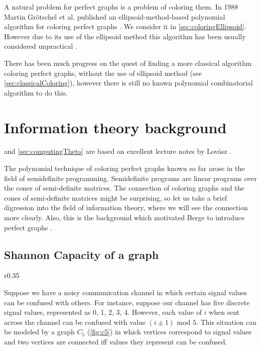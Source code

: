 A natural problem for perfect graphs is a problem of coloring them. In 1988 Martin Grötschel et al. published an ellipsoid-method-based polynomial algorithm for coloring perfect graphs \cite{Grtschel1993}. We consider it in \cref{sec:coloringEllipsoid}. However due to its use of the ellipsoid method this algorithm has been usually considered unpractical \cite{coloringSquareFree,Chudnovsky2003, coloringArtemis}.

There has been much progress on the quest of finding a more classical algorithm coloring perfect graphs, without the use of ellipsoid method (see \cref{sec:classicalColoring}), however there is still no known polynomial combinatorial algorithm to do this. 

\section{Information theory background}
\label{sec:InformationTheory}

 and \cref{sec:computingTheta} are based on excellent lecture notes by Lovász \cite{Lovasz95}.

The polynomial technique of coloring perfect graphs known so far arose in the field of semidefinite programming. Semidefinite programs are linear programs over the cones of semi-definite matrices. The connection of coloring graphs and the cones of semi-definite matrices might be surprising, so let us take a brief digression into the field of information theory, where we will see the connection more clearly. Also, this is the background which motivated Berge to introduce perfect graphs \cite{Chudnovsky2003}.

\subsection{Shannon Capacity of a graph}

\begin{wrapfigure}{r}{0.35\textwidth}
  
  \caption{An example of a noisy channel}%
  \label{fig:c5}
\end{wrapfigure}

Suppose we have a noisy communication channel in which certain signal values can be confused with others. For instance, suppose our channel has five discrete signal values, represented as 0, 1, 2, 3, 4. However, each value of $i$ when sent across the channel can be confused with value $(i \pm 1)$ mod $5$. This situation can be modeled by a graph $C_5$ (\cref{fig:c5}) in which vertices correspond to signal values and two vertices are connected iff values they represent can be confused.

